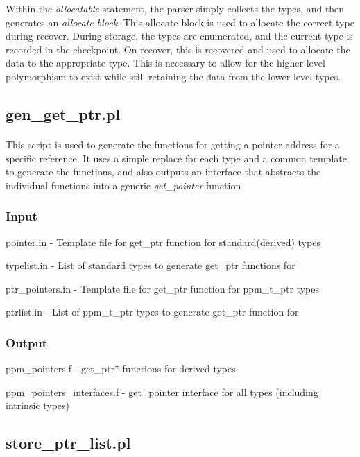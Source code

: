 \documentclass{article}
\begin{document}
Within the \emph{allocatable} statement, the parser simply collects the types, and then generates an \emph{allocate block}. This allocate block is used to allocate the correct type during recover. During storage, the types are enumerated, and the current type is recorded in the checkpoint. On recover, this is recovered and used to allocate the data to the appropriate type. This is necessary to allow for the higher level polymorphism to exist while still retaining the data from the lower level types.

\subsection{gen\_get\_ptr.pl}
\label{sec:gen_get_ptr}
\paragraph{}
This script is used to generate the functions for getting a pointer address for a specific reference. It uses a simple replace for each type and a common template to generate the functions, and also outputs an interface that abstracts the individual functions into a generic \emph{get\_pointer} function
\subsubsection{Input}
\begin{list}{}{}
\item pointer.in - Template file for get\_ptr function for standard(derived) types
\item typelist.in - List of standard types to generate get\_ptr functions for
\item ptr\_pointers.in - Template file for get\_ptr function for ppm\_t\_ptr types
\item ptrlist.in - List of ppm\_t\_ptr types to generate get\_ptr function for
\end{list}
\subsubsection{Output}
\begin{list}{}{}
\item ppm\_pointers.f - get\_ptr* functions for derived types
\item ppm\_pointers\_interfaces.f - get\_pointer interface for all types (including intrinsic types)
\end{list}

\subsection{store\_ptr\_list.pl}
\label{sec:store_ptr_list}
\end{document}

